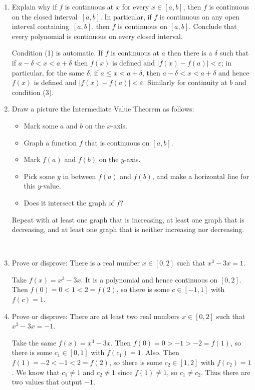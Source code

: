 \documentclass[12pt]{amsart}
\def\d{\delta}
\def\e{\varepsilon}
\numberwithin{equation}{section}
\theoremstyle{plain} %
\theoremstyle{definition}
\theoremstyle{remark}
\begin{document}
\begin{enumerate}
 \item Explain why if $f$ is continuous at $x$ for every $x\in[a,b]$, then $f$ is continuous on the closed interval~$[a,b]$. In particular, if $f$ is continuous on any open interval containing~$[a,b]$, then $f$ is continuous on $[a,b]$. Conclude that every polynomial is continuous on every closed interval.

\begin{framed}
Condition (1) is automatic. If $f$ is continuous at $a$ then there is a $\d$ such that if $a-\d < x < a+\d$ then $f(x)$ is defined and ${|f(x)
  - f(a)| < \e}$; in particular, for the same $\d$, if $a \leq x < a+\d$, then  $a-\d < x < a+\d$ and hence $f(x)$ is defined and ${|f(x)
  - f(a)| < \e}$. Similarly for continuity at $b$ and condition (3).
\end{framed}


\item Draw a picture the Intermediate Value Theorem as follows: 
\begin{itemize}
\item Mark some $a$ and $b$ on the $x$-axis. 
\item Graph a function $f$ that is continuous on $[a,b]$.
\item Mark $f(a)$ and $f(b)$ on the $y$-axis.
\item Pick some $y$ in between  $f(a)$ and $f(b)$, and make a horizontal line for this $y$-value.
\item Does it intersect the graph of $f$?
\end{itemize}
Repeat with at least one graph that is increasing, at least one graph that is decreasing, and at least one graph that is neither increasing nor decreasing.

\

\item Prove or disprove: There is a real number $x\in [0,2]$ such that $x^3 - 3x = 1$.

\begin{framed}
Take $f(x) = x^3 - 3x$. It is a polynomial and hence continuous on $[0,2]$.
Then $f(0) = 0 < 1 < 2= f(2)$, so there is some $c\in [-1,1]$ with $f(c) = 1$.
\end{framed}

\item Prove or disprove: There are at least two real numbers $x\in [0,2]$ such that $x^3 - 3x = -1$.

\begin{framed}
Take the same $f(x) = x^3 - 3x$.
Then $f(0) = 0 > -1 > -2 = f(1)$, so there is some $c_1\in [0,1]$ with $f(c_1) = 1$. Also,
Then $f(1) = -2 < -1 < 2 = f(2)$, so there is some $c_2\in [1,2]$ with $f(c_2) = 1$. We know that $c_1\neq 1$ and $c_2 \neq 1$ since $f(1)\neq 1$, so $c_1\neq c_2$. Thus there are two values that output $-1$.
\end{framed}


\end{enumerate}
\end{document}
